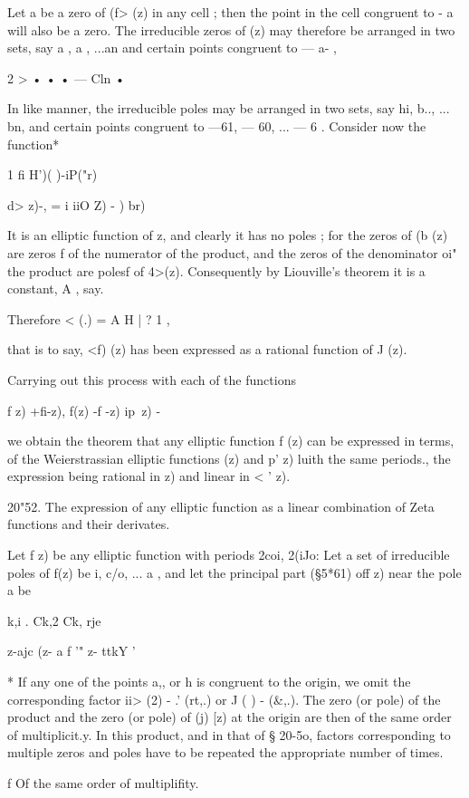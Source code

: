 {Let a be a zero of (f> (z) in any cell ; then the point in the cell
congruent to - a will also be a zero. The irreducible zeros of (z) may
therefore be arranged in two sets, say a , a , ...an and certain
points congruent to — a- ,

 2 > • • • — Cln •

In like manner, the irreducible poles may be arranged in two sets, say
hi, b.., ... bn, and certain points congruent to —61, — 60, ... — 6 .
Consider now the function*

1 fi H')( )-iP("r)

d> z)-, = i iiO Z) - ) br)

It is an elliptic function of z, and clearly it has no poles ; for the
zeros of (b (z) are zeros f of the numerator of the product, and the
zeros of the denominator oi" the product are polesf of 4>(z).
Consequently by Liouville's theorem it is a constant, A , say.

Therefore < (.) = A H | ? 1 ,

that is to say, <f) (z) has been expressed as a rational function of J
(z).

Carrying out this process with each of the functions

f z) +fi-z), f(z) -f -z) ip\ z) -\

we obtain the theorem that any elliptic function f (z) can be
expressed in terms, of the Weierstrassian elliptic functions (z) and
p' z) luith the same periods., the expression being rational in z) and
linear in < ' z).

20"52. The expression of any elliptic function as a linear combination
of Zeta functions and their derivates.

Let f z) be any elliptic function with periods 2coi, 2(iJo: Let a set
of irreducible poles of f(z) be i, c/o, ... a , and let the principal
part (§5*61) off z) near the pole a be

 k,i . Ck,2 Ck, rje

z-ajc (z- a f '" z- ttkY '

* If any one of the points a,, or h is congruent to the origin, we
omit the corresponding factor ii> (2) - .' (rt,.) or J ( ) - (\&,.).
The zero (or pole) of the product and the zero (or pole) of (j) [z) at
the origin are then of the same order of multiplicit.y. In this
product, and in that of § 20-5o, factors corresponding to multiple
zeros and poles have to be repeated the appropriate number of times.

f Of the same order of multiplifity.

}
